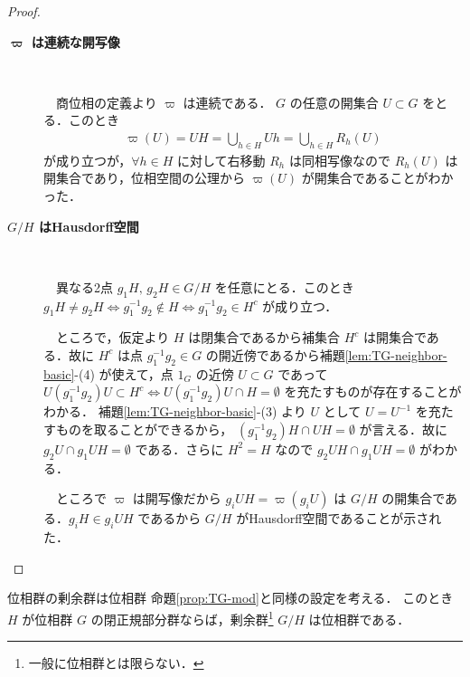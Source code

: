 \documentclass[algtopo_main]{subfiles}
\begin{document}
\begin{proof}
    \begin{description}
        \item[\textbf{$\bm{\varpi}$ は連続な開写像}] 　
        
        　商位相の定義より $\varpi$ は連続である．
        $G$ の任意の開集合 $U \subset G$ をとる．このとき
        \begin{align}
            \varpi (U) = UH = \bigcup_{h \in H} Uh = \bigcup_{h \in H} R_h(U)
        \end{align}
        が成り立つが，$\forall h \in H$ に対して右移動 $R_h$ は同相写像なので $R_h(U)$ は開集合であり，位相空間の公理から $\varpi (U)$ が開集合であることがわかった．
        \item[\textbf{$G/H$ はHausdorff空間}] 　
        
        　異なる2点 $g_1 H,\, g_2 H \in G/H$ を任意にとる．このとき $g_1 H \neq g_2 H \iff g_1^{-1} g_2 \notin H \iff g_1^{-1} g_2 \in H^c$ が成り立つ．
        
        　ところで，仮定より $H$ は閉集合であるから補集合 $H^c$ は開集合である．故に $H^c$ は点 $g_1^{-1} g_2 \in G$ の開近傍であるから補題\ref{lem:TG-neighbor-basic}-(4) が使えて，点 $1_G$ の近傍 $U \subset G$ であって 
        $U(g_1^{-1} g_2) U \subset H^c \iff U(g_1^{-1} g_2) U \cap H = \emptyset$ を充たすものが存在することがわかる．
        補題\ref{lem:TG-neighbor-basic}-(3) より $U$ として $U = U^{-1}$ を充たすものを取ることができるから，
        $(g_1^{-1} g_2) H \cap UH =\emptyset$ が言える．故に $g_2 U \cap g_1 UH = \emptyset$ である．さらに $H^2 = H$ なので $g_2 UH \cap g_1 UH = \emptyset$ がわかる．
        
        　ところで $\varpi$ は開写像だから $g_i UH = \varpi(g_i U)$ は $G/H$ の開集合である．$g_i H \in g_i UH$ であるから $G/H$ がHausdorff空間であることが示された．
    \end{description}
\end{proof}

\begin{myprop}[label=prop:TG-modG]{位相群の剰余群は位相群}
    命題\ref{prop:TG-mod}と同様の設定を考える． 
    このとき $H$ が位相群 $G$ の閉正規部分群ならば，剰余群\footnote{一般に位相群とは限らない．} $G/H$ は位相群である．
\end{myprop}
\end{document}
